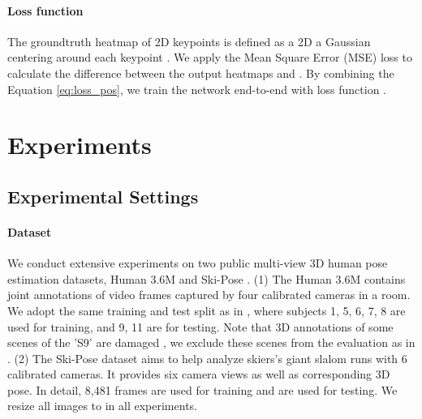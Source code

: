 \documentclass{bmvc2k}
\begin{document}
\vspace{-1.0em}
\paragraph{Loss function} 
The groundtruth heatmap  of 2D keypoints is defined as a 2D a Gaussian centering around each keypoint \cite{wei2016convolutional}. We apply the Mean Square Error (MSE) loss to calculate the difference between the output heatmaps  and . By combining the Equation \ref{eq:loss_pos}, we train the network end-to-end with loss function . 




\vspace{-0.5em}
\section{Experiments}
\vspace{-0.8em}
\subsection{Experimental Settings}
\vspace{-0.5em}
\paragraph{Dataset} 
We conduct extensive experiments on two public multi-view 3D human pose estimation datasets, Human 3.6M \cite{h36m_pami, IonescuSminchisescu11} and Ski-Pose \cite{sporri2016reasearch, rhodin2018learning, gilgien2013determination, gilgien2014effect, gilgien2015determination, fasel2016three, fasel2017joint}. 
(1) The Human 3.6M contains joint annotations of video frames captured by four calibrated cameras in a room. We adopt the same training and test split as in \cite{qiu2019cross, iskakov2019learnable, he2020epipolar}, where subjects 1, 5, 6, 7, 8 are used for training, and 9, 11 are for testing. 
Note that 3D annotations of some scenes of the ’S9’ are damaged \cite{iskakov2019learnable}, 
we exclude these scenes from the evaluation as in \cite{iskakov2019learnable, he2020epipolar}. 
(2) The Ski-Pose dataset aims to help analyze skiers's giant slalom runs with 6 calibrated cameras. It provides six camera views as well as corresponding 3D pose. 
In detail, 8,481 frames are used for training and  are used for testing. 
We resize all images to  in all experiments. 


\vspace{-0.8em}
\end{document}
